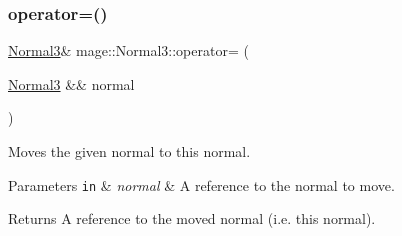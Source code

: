 \subsubsection{\texorpdfstring{operator=()}{operator=()}\hspace{0.1cm}{\footnotesize\ttfamily [2/2]}}
{\footnotesize\ttfamily \hyperlink{structmage_1_1_normal3}{Normal3}\& mage\+::\+Normal3\+::operator= (\begin{DoxyParamCaption}\item[{\hyperlink{structmage_1_1_normal3}{Normal3} \&\&}]{normal }\end{DoxyParamCaption})\hspace{0.3cm}{\ttfamily [default]}}

Moves the given normal to this normal.


\begin{DoxyParams}[1]{Parameters}
\mbox{\tt in}  & {\em normal} & A reference to the normal to move. \\
\hline
\end{DoxyParams}
\begin{DoxyReturn}{Returns}
A reference to the moved normal (i.\+e. this normal). 
\end{DoxyReturn}
